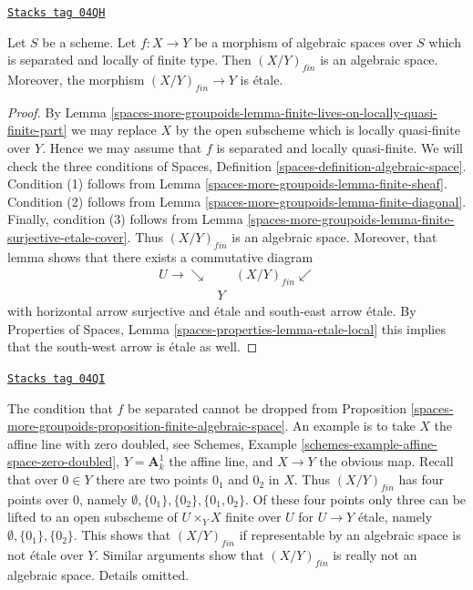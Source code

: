 \begin{proposition}
\label{spaces-more-groupoids-proposition-finite-algebraic-space}
\href{https://stacks.math.columbia.edu/tag/04QH}{\texttt{Stacks tag 04QH}}

Let $S$ be a scheme.
Let $f : X \to Y$ be a morphism of algebraic spaces over $S$ which
is separated and locally of finite type. Then $(X/Y)_{fin}$
is an algebraic space. Moreover, the morphism
$(X/Y)_{fin} \to Y$ is \'etale.
\end{proposition}

\begin{proof}
By
Lemma \ref{spaces-more-groupoids-lemma-finite-lives-on-locally-quasi-finite-part}
we may replace $X$ by the open subscheme which is locally quasi-finite
over $Y$. Hence we may assume that $f$ is separated and locally quasi-finite.
We will check the three conditions of
Spaces, Definition \ref{spaces-definition-algebraic-space}.
Condition (1) follows from
Lemma \ref{spaces-more-groupoids-lemma-finite-sheaf}.
Condition (2) follows from
Lemma \ref{spaces-more-groupoids-lemma-finite-diagonal}.
Finally, condition (3) follows from
Lemma \ref{spaces-more-groupoids-lemma-finite-surjective-etale-cover}.
Thus $(X/Y)_{fin}$ is an algebraic space.
Moreover, that lemma shows that there exists a commutative
diagram
$$
\begin{array}{ccc}U \longrightarrow\searrow &  & (X/Y)_{fin} \swarrow \\  & Y & \end{array}
$$
with horizontal arrow surjective and \'etale and south-east arrow
\'etale. By
Properties of Spaces, Lemma \ref{spaces-properties-lemma-etale-local}
this implies that the south-west arrow is \'etale as well.
\end{proof}

\begin{remark}[Warning]
\label{spaces-more-groupoids-remark-warning}
\href{https://stacks.math.columbia.edu/tag/04QI}{\texttt{Stacks tag 04QI}}

The condition that $f$ be separated cannot be dropped from
Proposition \ref{spaces-more-groupoids-proposition-finite-algebraic-space}.
An example is to take $X$ the affine line with zero doubled, see
Schemes, Example \ref{schemes-example-affine-space-zero-doubled},
$Y = \mathbf{A}^1_k$ the affine line, and $X \to Y$ the obvious map.
Recall that over $0 \in Y$ there are two points $0_1$ and $0_2$
in $X$. Thus $(X/Y)_{fin}$ has four points over $0$, namely
$\emptyset, \{0_1\}, \{0_2\}, \{0_1, 0_2\}$.
Of these four points only three can be lifted to an open
subscheme of $U \times_Y X$ finite over $U$ for $U \to Y$ \'etale,
namely $\emptyset, \{0_1\}, \{0_2\}$. This shows that $(X/Y)_{fin}$
if representable by an algebraic space is not \'etale over $Y$.
Similar arguments show that $(X/Y)_{fin}$ is really not an algebraic
space. Details omitted.
\end{remark}

